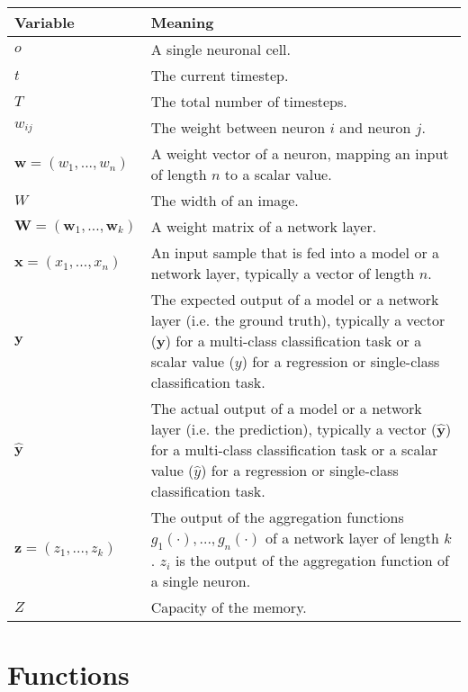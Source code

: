  \begin{tabular}{ p{3cm} p{11cm} }
	\textbf{Variable} & \textbf{Meaning}\\
	\hline
    $o$ & A single neuronal cell.\\
    $t$ & The current timestep.\\
     $T$ & The total number of timesteps.\\
    $w_{ij}$ & The weight between neuron $i$ and neuron $j$.\\
	$\boldsymbol{w} = (w_1, ..., w_n)$ & A weight vector of a neuron, mapping an input of length $n$ to a scalar value.\\
    $W$ & The width of an image.\\
	$\boldsymbol{W} = (\boldsymbol{w}_1, ..., \boldsymbol{w}_k)$ & A weight matrix of a network layer.\\
    $\boldsymbol{x} = (x_1, ..., x_n)$ & An input sample that is fed into a model or a network layer, typically a vector of length $n$.\\
     $\boldsymbol{y}$ & The expected output of a model or a network layer (i.e. the ground truth), typically a vector ($\boldsymbol{y}$) for a multi-class classification task or a scalar value ($y$) for a regression or single-class classification task.\\
 	$\boldsymbol{\hat{y}}$ & The actual output of a model or a network layer (i.e. the prediction), typically a vector ($\boldsymbol{\hat{y}}$) for a multi-class classification task or a scalar value ($\hat{y}$) for a regression or single-class classification task.\\
	$\boldsymbol{z} = (z_1, ..., z_k)$ & The output of the aggregation functions $g_1(\cdot), ..., g_n(\cdot)$ of a network layer of length $k$. $z_i$  is the output of the aggregation function of a single neuron.\\
    $Z$ & Capacity of the memory.\\
\end{tabular}


\section{Functions}

